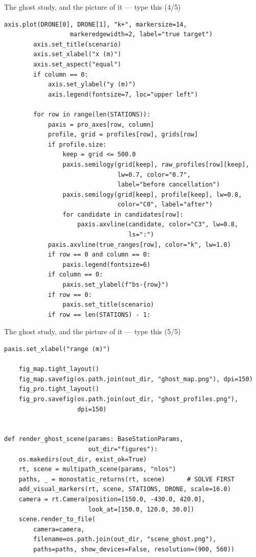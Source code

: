 \documentclass[10pt]{beamer}
\begin{document}
\begin{frame}[fragile]{The ghost study, and the picture of it --- type this (4/5)}
\begin{lstlisting}[basicstyle=\ttfamily\tiny]
        axis.plot(DRONE[0], DRONE[1], "k+", markersize=14,
                  markeredgewidth=2, label="true target")
        axis.set_title(scenario)
        axis.set_xlabel("x (m)")
        axis.set_aspect("equal")
        if column == 0:
            axis.set_ylabel("y (m)")
            axis.legend(fontsize=7, loc="upper left")

        for row in range(len(STATIONS)):
            paxis = pro_axes[row, column]
            profile, grid = profiles[row], grids[row]
            if profile.size:
                keep = grid <= 500.0
                paxis.semilogy(grid[keep], raw_profiles[row][keep],
                               lw=0.7, color="0.7",
                               label="before cancellation")
                paxis.semilogy(grid[keep], profile[keep], lw=0.8,
                               color="C0", label="after")
                for candidate in candidates[row]:
                    paxis.axvline(candidate, color="C3", lw=0.8,
                                  ls=":")
            paxis.axvline(true_ranges[row], color="k", lw=1.0)
            if row == 0 and column == 0:
                paxis.legend(fontsize=6)
            if column == 0:
                paxis.set_ylabel(f"bs-{row}")
            if row == 0:
                paxis.set_title(scenario)
            if row == len(STATIONS) - 1:
\end{lstlisting}
\end{frame}

\begin{frame}[fragile]{The ghost study, and the picture of it --- type this (5/5)}
\begin{lstlisting}[basicstyle=\ttfamily\tiny]
                paxis.set_xlabel("range (m)")

    fig_map.tight_layout()
    fig_map.savefig(os.path.join(out_dir, "ghost_map.png"), dpi=150)
    fig_pro.tight_layout()
    fig_pro.savefig(os.path.join(out_dir, "ghost_profiles.png"),
                    dpi=150)


def render_ghost_scene(params: BaseStationParams,
                       out_dir="figures"):
    os.makedirs(out_dir, exist_ok=True)
    rt, scene = multipath_scene(params, "nlos")
    paths, _ = monostatic_returns(rt, scene)      # SOLVE FIRST
    add_visual_markers(rt, scene, STATIONS, DRONE, scale=16.0)
    camera = rt.Camera(position=[150.0, -430.0, 420.0],
                       look_at=[150.0, 120.0, 30.0])
    scene.render_to_file(
        camera=camera,
        filename=os.path.join(out_dir, "scene_ghost.png"),
        paths=paths, show_devices=False, resolution=(900, 560))
\end{lstlisting}
\end{frame}
\end{document}
